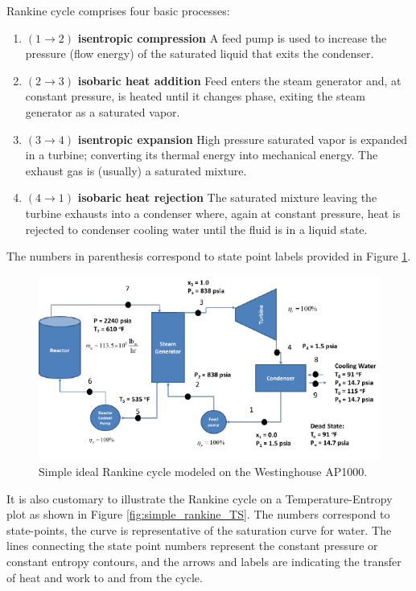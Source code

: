 \documentclass{tufte-book}
\begin{document}
 Rankine cycle comprises four basic processes:
\begin{enumerate}
\item $(1 \rightarrow 2)$ \textbf{isentropic compression} A feed pump is used to increase the pressure (flow energy) of the saturated liquid that exits the condenser.
\item $(2 \rightarrow 3)$ \textbf{isobaric heat addition} Feed enters the steam generator and, at constant pressure, is heated until it changes phase, exiting the steam generator as a saturated vapor.
\item $(3 \rightarrow 4)$ \textbf{isentropic expansion} High pressure saturated vapor is expanded in a turbine; converting its thermal energy into mechanical energy.  The exhaust gas is (usually) a saturated mixture.
\item $(4 \rightarrow 1)$ \textbf{isobaric heat rejection} The saturated mixture leaving the turbine exhausts into a condenser where, again at constant pressure, heat is rejected to condenser cooling water until the fluid is in a liquid state.
\end{enumerate}
The numbers in parenthesis correspond to state point labels provided in Figure \ref{fig:simple_rankine}.

\begin{figure}
\includegraphics{simple_ideal_rankine.pdf}
\caption{Simple ideal Rankine cycle modeled on the Westinghouse AP1000.}
\label{fig:simple_rankine}
\end{figure}

It is also customary to illustrate the Rankine cycle on a Temperature-Entropy plot as shown in Figure \ref{fig:simple_rankine_TS}.  The numbers correspond to state-points, the curve is representative of the saturation curve for water.  The lines connecting the state point numbers represent the constant pressure or constant entropy contours, and the arrows and labels are indicating the transfer of heat and work to and from the cycle.
\end{document}
